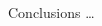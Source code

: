 \begin{columns}[t]
\begin{column}{0.32\linewidth}
    \begin{purpleblock}{Conclusions}
      \dots
    \end{purpleblock}

    \printbibliography[heading=none]

  \end{column}

\end{columns}

